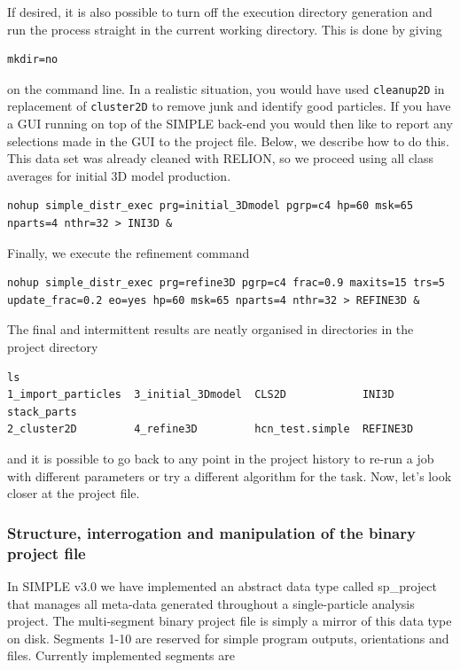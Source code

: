 \documentclass[a4paper,11pt]{article}
\newcommand{\prgname}[1]{\textcolor{NavyBlue}{\texttt{#1}}}
\begin{document}
\noindent{}If desired, it is also possible to turn off the execution directory generation and run the process straight in the current working directory. This is done by giving
\begin{Verbatim}[commandchars=+\[\],fontsize=\small,breaklines=true]
mkdir=no
\end{Verbatim}
\noindent{}on the command line. In a realistic situation, you would have used \prgname{cleanup2D} in replacement of \prgname{cluster2D} to remove junk and identify good particles. If you have a GUI running on top of the SIMPLE back-end you would then like to report any selections made in the GUI to the project file. Below, we describe how to do this. This data set was already cleaned with RELION, so we proceed using all class averages for initial 3D model production.

\begin{Verbatim}[commandchars=+\[\],fontsize=\small,breaklines=true]
nohup simple_distr_exec prg=initial_3Dmodel pgrp=c4 hp=60 msk=65 nparts=4 nthr=32 > INI3D &
\end{Verbatim}

\noindent{}Finally, we execute the refinement command

\begin{Verbatim}[commandchars=+\[\],fontsize=\small,breaklines=true]
nohup simple_distr_exec prg=refine3D pgrp=c4 frac=0.9 maxits=15 trs=5 update_frac=0.2 eo=yes hp=60 msk=65 nparts=4 nthr=32 > REFINE3D &
\end{Verbatim}

\noindent{}The final and intermittent results are neatly organised in directories in the project directory

\begin{Verbatim}[commandchars=+\[\],fontsize=\small,breaklines=true]
ls
1_import_particles  3_initial_3Dmodel  CLS2D            INI3D     stack_parts
2_cluster2D         4_refine3D         hcn_test.simple  REFINE3D
\end{Verbatim}

\noindent{}and it is possible to go back to any point in the project history to re-run a job with different parameters or try a different algorithm for the task. Now, let's look closer at the project file.

\subsubsection{Structure, interrogation and manipulation of the binary project file}
In SIMPLE v3.0 we have implemented an abstract data type called sp\_project that manages all meta-data generated throughout a single-particle analysis project. The multi-segment binary project file is simply a mirror of this data type on disk. Segments 1-10 are reserved  for simple program outputs, orientations and files. Currently implemented segments are
\end{document}
